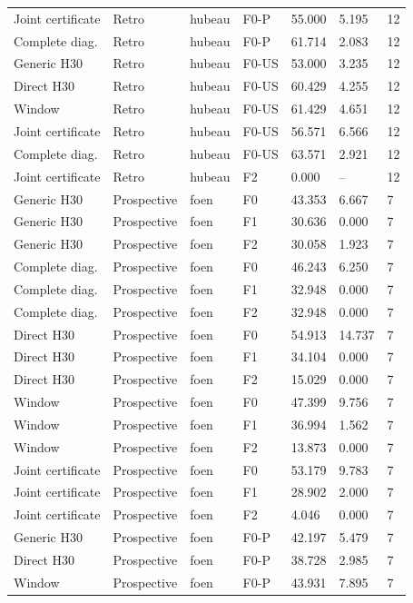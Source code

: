 {\begin{longtable}{p{}p{}p{}p{}p{}p{}p{}}
Joint certificate & Retro & hubeau & F0-P & 55.000 & 5.195 & 12 \\
Complete diag. & Retro & hubeau & F0-P & 61.714 & 2.083 & 12 \\
Generic H30 & Retro & hubeau & F0-US & 53.000 & 3.235 & 12 \\
Direct H30 & Retro & hubeau & F0-US & 60.429 & 4.255 & 12 \\
Window & Retro & hubeau & F0-US & 61.429 & 4.651 & 12 \\
Joint certificate & Retro & hubeau & F0-US & 56.571 & 6.566 & 12 \\
Complete diag. & Retro & hubeau & F0-US & 63.571 & 2.921 & 12 \\
Joint certificate & Retro & hubeau & F2 & 0.000 & -- & 12 \\
Generic H30 & Prospective & foen & F0 & 43.353 & 6.667 & 7 \\
Generic H30 & Prospective & foen & F1 & 30.636 & 0.000 & 7 \\
Generic H30 & Prospective & foen & F2 & 30.058 & 1.923 & 7 \\
Complete diag. & Prospective & foen & F0 & 46.243 & 6.250 & 7 \\
Complete diag. & Prospective & foen & F1 & 32.948 & 0.000 & 7 \\
Complete diag. & Prospective & foen & F2 & 32.948 & 0.000 & 7 \\
Direct H30 & Prospective & foen & F0 & 54.913 & 14.737 & 7 \\
Direct H30 & Prospective & foen & F1 & 34.104 & 0.000 & 7 \\
Direct H30 & Prospective & foen & F2 & 15.029 & 0.000 & 7 \\
Window & Prospective & foen & F0 & 47.399 & 9.756 & 7 \\
Window & Prospective & foen & F1 & 36.994 & 1.562 & 7 \\
Window & Prospective & foen & F2 & 13.873 & 0.000 & 7 \\
Joint certificate & Prospective & foen & F0 & 53.179 & 9.783 & 7 \\
Joint certificate & Prospective & foen & F1 & 28.902 & 2.000 & 7 \\
Joint certificate & Prospective & foen & F2 & 4.046 & 0.000 & 7 \\
Generic H30 & Prospective & foen & F0-P & 42.197 & 5.479 & 7 \\
Direct H30 & Prospective & foen & F0-P & 38.728 & 2.985 & 7 \\
Window & Prospective & foen & F0-P & 43.931 & 7.895 & 7 \\

\end{longtable}}
